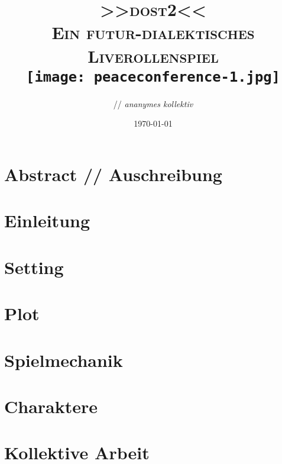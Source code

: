 \documentclass[12pt, a4paper, openany]{book}
\title{
  { \Large 
    \textbf{\textsc{>>\acs{dost2}<<}}\\
  }
  \vspace{0.4cm}
  { \large \color{gray}
    \textsc{Ein futur-dialektisches Liverollenspiel}
  }\\
  \vspace{2cm}
  {\texttt{[image: peaceconference-1.jpg]}}\\
  \vspace{1cm}
}
\author{\creators{} // \emph{ananymes kollektiv}}
\date{{\small \today}}
\begin{document}
\frontmatter

\begingroup
  \hypersetup{hidelinks}
  \maketitle
\endgroup

\chapter*{Abstract // Auschreibung}


\begingroup
  \hypersetup{hidelinks}
  \tableofcontents
\endgroup



\mainmatter
\chapter{Einleitung}


\chapter{Setting}


\chapter{Plot}


\chapter{Spielmechanik}


\chapter{Charaktere}


\chapter{Kollektive Arbeit}

\end{document}
